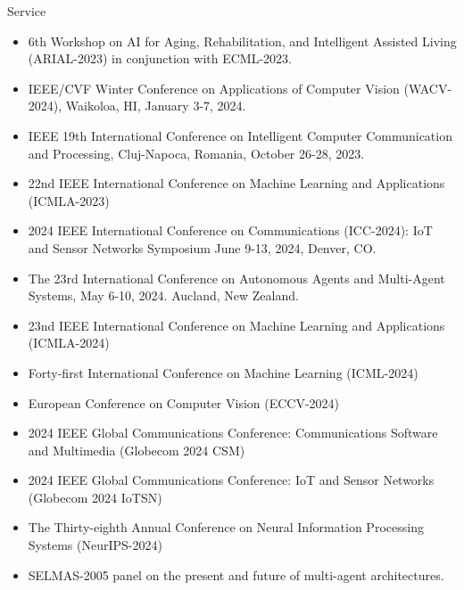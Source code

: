 \begin{category}{Service}
\begin{itemize}
\item 6th Workshop on AI for Aging, Rehabilitation, and Intelligent Assisted Living (ARIAL-2023) in conjunction with ECML-2023.

\item IEEE/CVF Winter Conference on Applications of Computer Vision (WACV-2024), Waikoloa, HI, January 3-7, 2024.

\item IEEE 19th International Conference on Intelligent Computer Communication and Processing, Cluj-Napoca, Romania, October 26-28, 2023.

\item 22nd IEEE International Conference on Machine Learning and Applications (ICMLA-2023)

\item 2024 IEEE International Conference on Communications (ICC-2024): IoT and Sensor Networks Symposium June 9-13, 2024, Denver, CO.

\item The 23rd International Conference on Autonomous Agents and Multi-Agent Systems, May 6-10, 2024. Aucland, New Zealand.

\item 23nd IEEE International Conference on Machine Learning and Applications (ICMLA-2024)

\item Forty-first International Conference on Machine Learning (ICML-2024)

\item European Conference on Computer Vision (ECCV-2024)

\item 2024 IEEE Global Communications Conference: Communications Software and Multimedia (Globecom 2024 CSM)

\item 2024 IEEE Global Communications Conference: IoT and Sensor Networks (Globecom 2024 IoTSN)

\item The Thirty-eighth Annual Conference on Neural Information Processing Systems (NeurIPS-2024)

\end{itemize}


%
%

\begin{itemize}
\item SELMAS-2005 panel on the present and future of multi-agent architectures.


\end{itemize}
\end{category}
